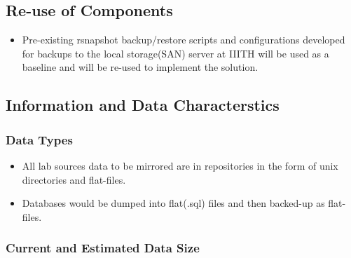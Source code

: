 \documentclass[11pt]{article}
\begin{document}
\subsection{Re-use of Components}
\label{sec-8.2}

\begin{itemize}
\item Pre-existing rsnapshot backup/restore scripts and configurations
   developed for backups to the local storage(SAN) server at IIITH
   will be used as a baseline and will be re-used to implement the
   solution.
\end{itemize}
\subsection{Information and Data Characterstics}
\label{sec-8.3}

\subsubsection{Data Types}
\label{sec-8.3.1}

\begin{itemize}
\item All lab sources data to be mirrored are in repositories in the form of unix directories and flat-files.
\item Databases would be dumped into flat(.sql) files and then backed-up as flat-files.
\end{itemize}
\subsubsection{Current and Estimated Data Size}
\label{sec-8.3.2}
\end{document}
